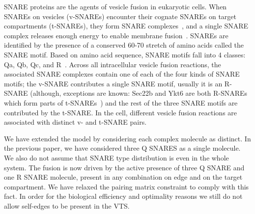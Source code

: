 SNARE proteins are the agents of vesicle fusion in eukaryotic cells. When SNAREs on vesicles (v-SNAREs) encounter their cognate SNAREs on target compartments (t-SNAREs), they form SNARE complexes~\cite{jahn2006snares}, and a single SNARE complex releases enough energy to enable membrane fusion~\cite{van2010one}. SNAREs are identified by the presence of a conserved 60-70 stretch of amino acids called the SNARE motif. Based on amino acid sequence, SNARE motifs fall into 4 classes: Qa, Qb, Qc, and R~\cite{jahn2006snares}. Across all intracellular vesicle fusion reactions, the associated SNARE complexes contain one of each of the four kinds of SNARE motifs; the v-SNARE contributes a single SNARE motif, usually it is an R-SNARE (although, exceptions are known: Sec22b and Ykt6 are both R-SNAREs which form parts of t-SNAREs~\cite{hong}) and the rest of the three SNARE
motifs are contributed by the t-SNARE. In the cell, different vesicle fusion reactions are associated with distinct v- and t-SNARE pairs.

We have extended the model by considering each complex molecule as distinct. In the previous paper, we have considered three Q SNARES as a single molecule. We also do not assume that SNARE type distribution is even in the whole system. The fusion is now driven by the active presence of three Q SNARE and one R SNARE molecule, present in any combination on edge and on the target compartment. We have relaxed the pairing matrix constraint to comply with this fact. In order for the biological efficiency and optimality reasons we still do not allow self-edges to be present in the VTS. 


